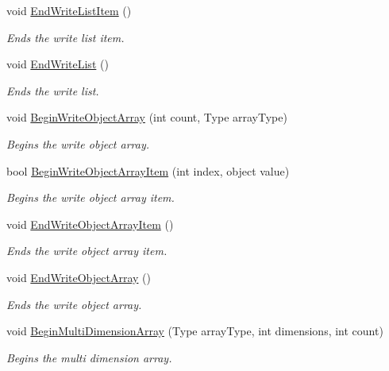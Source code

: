 \begin{DoxyCompactItemize}
void \hyperlink{interface_serialization_1_1_i_storage_a996ec10cec9f039c84f059ab511dce31}{End\+Write\+List\+Item} ()
\begin{DoxyCompactList}\small\item\em Ends the write list item. \end{DoxyCompactList}\item 
void \hyperlink{interface_serialization_1_1_i_storage_a1698725786d0d7d7360a8ead45ebe3ea}{End\+Write\+List} ()
\begin{DoxyCompactList}\small\item\em Ends the write list. \end{DoxyCompactList}\item 
void \hyperlink{interface_serialization_1_1_i_storage_afc5be795dc2ef9b4fc64abbd764ac7e5}{Begin\+Write\+Object\+Array} (int count, Type array\+Type)
\begin{DoxyCompactList}\small\item\em Begins the write object array. \end{DoxyCompactList}\item 
bool \hyperlink{interface_serialization_1_1_i_storage_a22a9b9ce868724387a5fe655089c08a7}{Begin\+Write\+Object\+Array\+Item} (int index, object value)
\begin{DoxyCompactList}\small\item\em Begins the write object array item. \end{DoxyCompactList}\item 
void \hyperlink{interface_serialization_1_1_i_storage_a0cde5cf5cf0ba7a6a229213330619a49}{End\+Write\+Object\+Array\+Item} ()
\begin{DoxyCompactList}\small\item\em Ends the write object array item. \end{DoxyCompactList}\item 
void \hyperlink{interface_serialization_1_1_i_storage_a0b6c30b5cb2849e6b9a6e46416867c96}{End\+Write\+Object\+Array} ()
\begin{DoxyCompactList}\small\item\em Ends the write object array. \end{DoxyCompactList}\item 
void \hyperlink{interface_serialization_1_1_i_storage_a72684673376a726a241741854652b3ba}{Begin\+Multi\+Dimension\+Array} (Type array\+Type, int dimensions, int count)
\begin{DoxyCompactList}\small\item\em Begins the multi dimension array. \end{DoxyCompactList}\item 

\end{DoxyCompactItemize}

